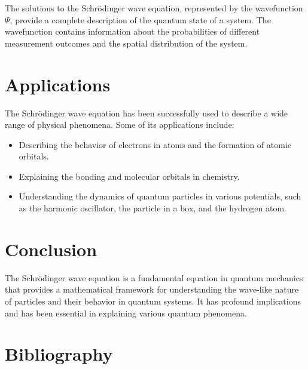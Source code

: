 \documentclass{article}
\begin{document}
The solutions to the Schrödinger wave equation, represented by the wavefunction $\Psi$, provide a complete description of the quantum state of a system. The wavefunction contains information about the probabilities of different measurement outcomes and the spatial distribution of the system.

\section{Applications}

The Schrödinger wave equation has been successfully used to describe a wide range of physical phenomena. Some of its applications include:

\begin{itemize}
  \item Describing the behavior of electrons in atoms and the formation of atomic orbitals.
  \item Explaining the bonding and molecular orbitals in chemistry.
  \item Understanding the dynamics of quantum particles in various potentials, such as the harmonic oscillator, the particle in a box, and the hydrogen atom.
\end{itemize}

\section{Conclusion}

The Schrödinger wave equation is a fundamental equation in quantum mechanics that provides a mathematical framework for understanding the wave-like nature of particles and their behavior in quantum systems. It has profound implications and has been essential in explaining various quantum phenomena.

\section{Bibliography}
\cite{beiser1963}



\end{document}
